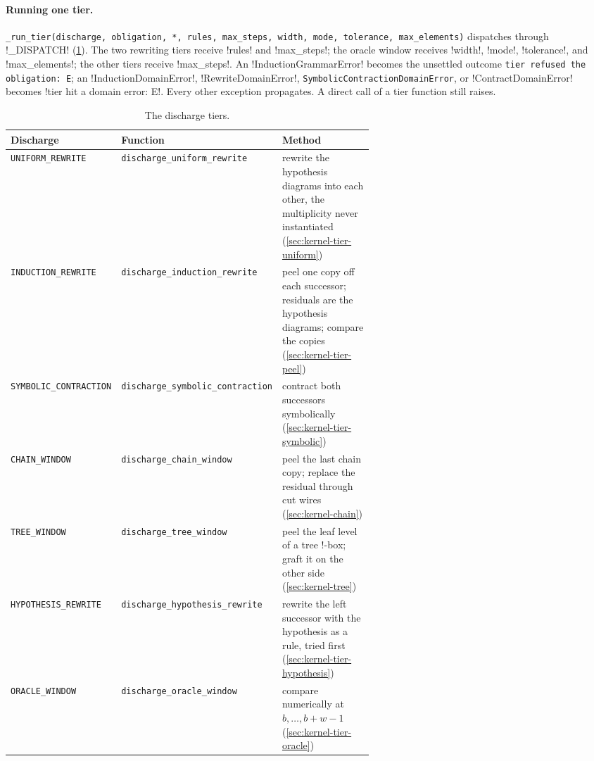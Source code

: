 \paragraph{Running one tier.} \texttt{\_\allowbreak{}run\_\allowbreak{}tier(\allowbreak{}discharge,\allowbreak{} obligation,\allowbreak{} *,\allowbreak{} rules,\allowbreak{} max\_\allowbreak{}steps,\allowbreak{} width,\allowbreak{} mode,\allowbreak{} tolerance,\allowbreak{} max\_\allowbreak{}elements)} dispatches through \py!_DISPATCH! (\cref{tab:kernel-tiers}). The two rewriting tiers receive \code!rules! and \code!max_steps!; the oracle window receives \code!width!, \code!mode!, \code!tolerance!, and \code!max_elements!; the other tiers receive \code!max_steps!. An \py!InductionGrammarError! becomes the unsettled outcome \texttt{tier refused the obligation: E}; an \py!InductionDomainError!, \py!RewriteDomainError!, \texttt{SymbolicContractionDomainError}, or \py!ContractDomainError! becomes \code!tier hit a domain error: E!. Every other exception propagates. A direct call of a tier function still raises.

\begin{table}[H]
\centering\small
\begin{tabularx}{\linewidth}{@{}>{\raggedright\arraybackslash}p{0.27\linewidth}>{\raggedright\arraybackslash}p{0.33\linewidth}X@{}}
\toprule
Discharge & Function & Method \\
\midrule
\texttt{UNIFORM\_REWRITE} & \texttt{discharge\_uniform\_rewrite} & rewrite the hypothesis diagrams into each other, the multiplicity never instantiated (\cref{sec:kernel-tier-uniform}) \\
\texttt{INDUCTION\_REWRITE} & \texttt{discharge\_induction\_rewrite} & peel one copy off each successor; residuals are the hypothesis diagrams; compare the copies (\cref{sec:kernel-tier-peel}) \\
\texttt{SYMBOLIC\_CONTRACTION} & \texttt{discharge\_symbolic\_\allowbreak contraction} & contract both successors symbolically (\cref{sec:kernel-tier-symbolic}) \\
\texttt{CHAIN\_WINDOW} & \texttt{discharge\_chain\_window} & peel the last chain copy; replace the residual through cut wires (\cref{sec:kernel-chain}) \\
\texttt{TREE\_WINDOW} & \texttt{discharge\_tree\_window} & peel the leaf level of a tree !-box; graft it on the other side (\cref{sec:kernel-tree}) \\
\texttt{HYPOTHESIS\_REWRITE} & \texttt{discharge\_hypothesis\_\allowbreak rewrite} & rewrite the left successor with the hypothesis as a rule, tried first (\cref{sec:kernel-tier-hypothesis}) \\
\texttt{ORACLE\_WINDOW} & \texttt{discharge\_oracle\_window} & compare numerically at $b,\ldots,b+w-1$ (\cref{sec:kernel-tier-oracle}) \\
\bottomrule
\end{tabularx}
\caption{The discharge tiers.}\label{tab:kernel-tiers}
\end{table}

